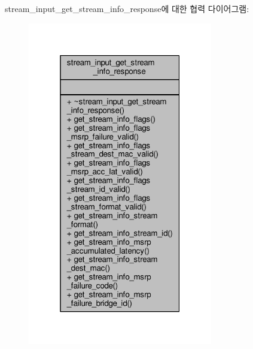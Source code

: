 stream\+\_\+input\+\_\+get\+\_\+stream\+\_\+info\+\_\+response에 대한 협력 다이어그램\+:
\nopagebreak
\begin{figure}[H]
\begin{center}
\leavevmode
\includegraphics[width=229pt]{classavdecc__lib_1_1stream__input__get__stream__info__response__coll__graph}
\end{center}
\end{figure}
